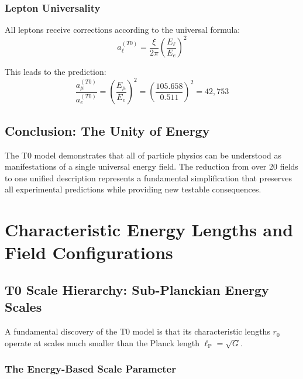 \documentclass[12pt,a4paper]{report}
\newcommand{\lP}{\ell_{\text{P}}}         %
\newcommand{\rzero}{r_0}                  %
\begin{document}
	\subsection{Lepton Universality}
	\label{subsec:lepton_universality}
	
	All leptons receive corrections according to the universal formula:
	\begin{equation}
		a_\ell^{(T0)} = \frac{\xi}{2\pi} \left(\frac{E_\ell}{E_e}\right)^2
	\end{equation}
	
	This leads to the prediction:
	\begin{equation}
		\frac{a_\mu^{(T0)}}{a_e^{(T0)}} = \left(\frac{E_\mu}{E_e}\right)^2 = \left(\frac{105.658}{0.511}\right)^2 = 42,753
	\end{equation}
	
	\section{Conclusion: The Unity of Energy}
	\label{sec:conclusion_unity}
	
	The T0 model demonstrates that all of particle physics can be understood as manifestations of a single universal energy field. The reduction from over 20 fields to one unified description represents a fundamental simplification that preserves all experimental predictions while providing new testable consequences.
	\chapter{Characteristic Energy Lengths and Field Configurations}
	\label{chap:energy_lengths_configurations}
	
	\section{T0 Scale Hierarchy: Sub-Planckian Energy Scales}
	\label{sec:scale_hierarchy}
	
	A fundamental discovery of the T0 model is that its characteristic lengths $\rzero$ operate at scales much smaller than the Planck length $\lP = \sqrt{G}$.
	
	\subsection{The Energy-Based Scale Parameter}
	\label{subsec:energy_based_scale_parameter}
	
\end{document}

